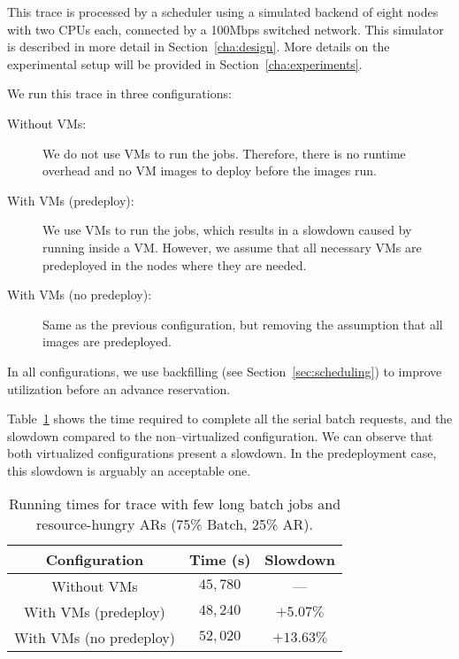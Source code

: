 This trace is processed by a scheduler using a simulated backend of eight nodes with two CPUs each, connected by a 100Mbps switched network. This simulator is described in more detail in Section~\ref{cha:design}. More details on the experimental setup will be provided in Section~\ref{cha:experiments}.

We run this trace in three configurations:

\begin{description}
\item[Without VMs:] We do not use VMs to run the jobs. Therefore, there is no runtime overhead and no VM images to deploy before the images run.
\item[With VMs (predeploy):] We use VMs to run the jobs, which results in a slowdown caused by running inside a VM. However, we assume that all necessary VMs are predeployed in the nodes where they are needed.
\item[With VMs (no predeploy):] Same as the previous configuration, but removing the assumption that all images are predeployed.
\end{description}

In all configurations, we use backfilling (see Section~\ref{sec:scheduling}) to improve utilization before an advance reservation.

Table~\ref{tab:longjoboverview} shows the time required to complete all the serial batch requests, and the slowdown compared to the non--virtualized configuration. We can observe that both virtualized configurations present a slowdown. In the predeployment case, this slowdown is arguably an acceptable one.

\begin{table}
\begin{center}
\caption{Running times for trace with few long batch jobs and resource-hungry ARs (75\% Batch, 25\% AR).}
\begin{tabular}{|c|c|c|}
\hline
 \textbf{Configuration} & \textbf{Time (s)} & \textbf{Slowdown} \\\hline\hline
Without VMs & $45,780$ & --- \\\hline
With VMs (predeploy) & $48,240$ & $+5.07\%$ \\\hline 
With VMs (no predeploy) & $52,020$ & $+13.63\%$ \\\hline
\end{tabular}
\label{tab:longjoboverview}
\end{center}
\end{table}

